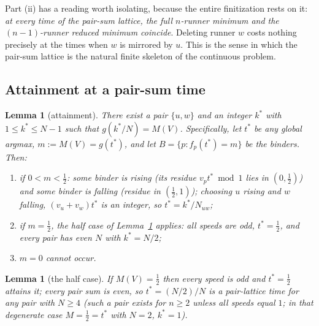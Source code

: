 \documentclass[11pt,a4paper]{article}
\numberwithin{equation}{section}
\theoremstyle{plain}
\theoremstyle{plain}
\newtheorem{lemma}[theorem]{Lemma}
\theoremstyle{definition}
\theoremstyle{remark}
\begin{document}
Part (ii) has a reading worth isolating, because the entire finitization
rests on it: \emph{at every time of the pair-sum lattice, the full
$n$-runner minimum and the $(n{-}1)$-runner reduced minimum coincide}.
Deleting runner $w$ costs nothing precisely at the times when $w$ is
mirrored by $u$. This is the sense in which the pair-sum lattice is the
natural finite skeleton of the continuous problem.

\subsection{Attainment at a pair-sum time}

\begin{lemma}[attainment]\label{lem:attainment}
There exist a pair $\{u,w\}$ and an integer $k^\ast$ with
$1\le k^\ast\le N-1$ such that $g(k^\ast/N)=M(V)$. Specifically, let
$t^\ast$ be any global argmax, $m:=M(V)=g(t^\ast)$, and let
$B=\{p: f_p(t^\ast)=m\}$ be the binders. Then:
\begin{enumerate}[leftmargin=1.8em,itemsep=1pt]
\item[(a)] if $0<m<\tfrac12$: some binder is \emph{rising} (its residue
  $v_p t^\ast\bmod 1$ lies in $(0,\tfrac12)$) and some binder is
  \emph{falling} (residue in $(\tfrac12,1)$); choosing $u$ rising and $w$
  falling, $(v_u+v_w)t^\ast$ is an integer, so
  $t^\ast=k^\ast/N_{uw}$;
\item[(b)] if $m=\tfrac12$, the half case of
Lemma~\ref{lem:halfcase} applies: all speeds are odd, $t^\ast=\tfrac12$,
and every pair has even $N$ with $k^\ast=N/2$;
\item[(c)] $m=0$ cannot occur.
\end{enumerate}
\end{lemma}

\begin{lemma}[the half case]\label{lem:halfcase}
If $M(V)=\tfrac12$ then every speed is odd and $t^\ast=\tfrac12$
attains it; every pair sum is even, so $t^\ast=(N/2)/N$ is a
pair-lattice time for any pair with $N\ge 4$ (such a pair exists for
$n\ge2$ unless all speeds equal $1$; in that degenerate case
$M=\tfrac12=t^\ast$ with $N=2$, $k^\ast=1$).
\end{lemma}
\end{document}
